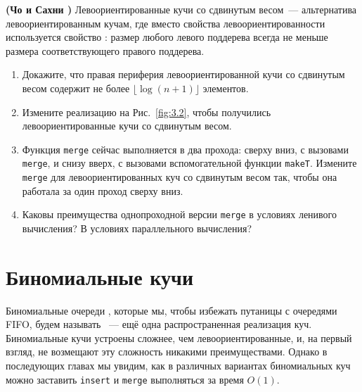 \begin{exercise}\label{ex:3.4}
  \textbf{(Чо и Сахни \cite{ChoSahni1996})} Левоориентированные кучи
  со сдвинутым весом~--- альтернатива левоориентированным кучам, где
  вместо свойства левоориентированности используется свойство
  : размер любого левого поддерева всегда не меньше размера
  соответствующего правого поддерева.
  \begin{enumerate}
  \item Докажите, что правая периферия левоориентированной кучи со
    сдвинутым весом содержит не более $\lfloor \log(n+1) \rfloor$ элементов.
  \item Измените реализацию на Рис.~\ref{fig:3.2}, чтобы получились
    левоориентированные кучи со сдвинутым весом.
  \item Функция \lstinline!merge! сейчас выполняется в два прохода:
    сверху вниз, с вызовами \lstinline!merge!, и снизу вверх, с
    вызовами вспомогательной функции \lstinline!makeT!. Измените
    \lstinline!merge! для левоориентированных куч со сдвинутым весом
    так, чтобы она работала за один проход сверху вниз.
  \item Каковы преимущества однопроходной версии \lstinline!merge! в
    условиях ленивого вычисления? В условиях параллельного вычисления? 
  \end{enumerate}
\end{exercise}

\section{Биномиальные кучи}
\label{sc:3.2}

Биномиальные очереди \cite{Vuillemin1978, Brown1978}, которые мы,
чтобы избежать путаницы с очередями FIFO, будем называть ~--- ещё одна распространенная реализация
куч. Биномиальные кучи устроены сложнее, чем левоориентированные, и, на
первый взгляд, не возмещают эту сложность никакими
преимуществами. Однако в последующих главах мы увидим, как в различных
вариантах биномиальных куч можно заставить \lstinline!insert! и
\lstinline!merge! выполняться за время $O(1)$.

